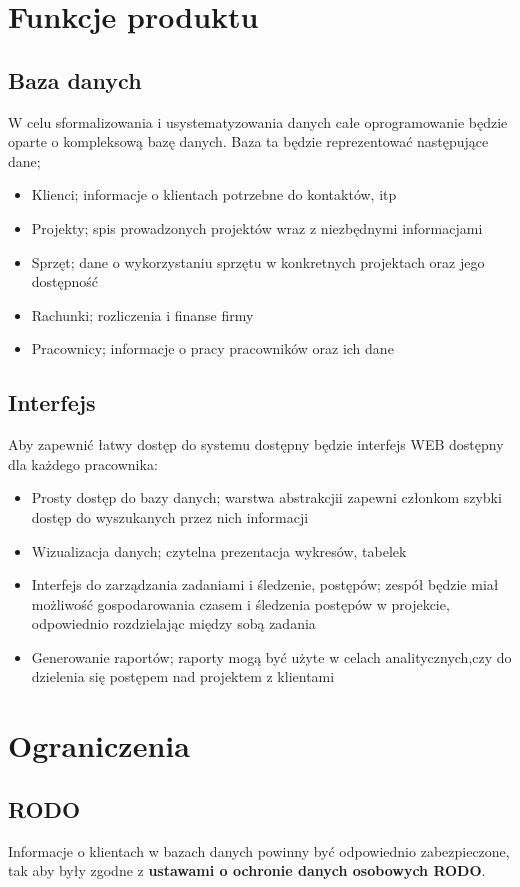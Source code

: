 \documentclass{article}
\begin{document}
\section{Funkcje produktu}
\subsection{Baza danych}
W celu sformalizowania i usystematyzowania danych całe oprogramowanie będzie oparte
o kompleksową bazę danych. Baza ta będzie reprezentować następujące dane;
\begin{itemize}
    \item Klienci; informacje o klientach potrzebne do kontaktów, itp
    \item Projekty; spis prowadzonych projektów wraz z niezbędnymi informacjami
    \item Sprzęt; dane o wykorzystaniu sprzętu w konkretnych projektach oraz jego dostępność
    \item Rachunki; rozliczenia i finanse firmy
    \item Pracownicy; informacje o pracy pracowników oraz ich dane
\end{itemize}
\subsection{Interfejs}
Aby zapewnić łatwy dostęp do systemu dostępny będzie interfejs WEB dostępny dla każdego pracownika:
\begin{itemize}
    \item Prosty dostęp do bazy danych; warstwa abstrakcjii zapewni członkom szybki dostęp do wyszukanych przez nich informacji
    \item Wizualizacja danych; czytelna prezentacja wykresów, tabelek
    \item Interfejs do zarządzania zadaniami i śledzenie, postępów; zespół będzie miał możliwość gospodarowania czasem i śledzenia postępów w projekcie, odpowiednio rozdzielając między sobą zadania
    \item Generowanie raportów; raporty mogą być użyte w celach analitycznych,czy do dzielenia się postępem nad projektem z klientami
\end{itemize}
\section{Ograniczenia}
\subsection{RODO}
Informacje o klientach w bazach danych powinny być odpowiednio zabezpieczone, tak aby były zgodne z \textbf{ustawami o ochronie danych osobowych RODO}.
\end{document}

